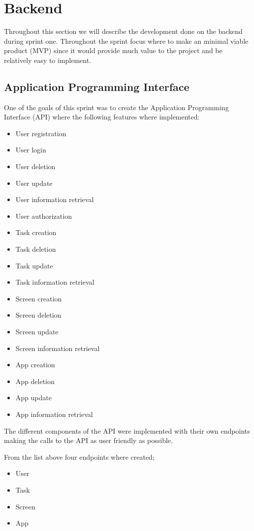 \section{Backend}

Throughout this section we will describe the development done on the backend during sprint one.
Throughout the sprint focus where to make an minimal viable product (MVP) since it would provide much value to the project and be relatively easy to implement.

\subsection{Application Programming Interface}

One of the goals of this sprint was to create the Application Programming Interface (API) where the following features where implemented:
\begin{itemize}
    \item User registration
    \item User login
    \item User deletion
    \item User update
    \item User information retrieval
    \item User authorization
    \item Task creation
    \item Task deletion
    \item Task update
    \item Task information retrieval
    \item Screen creation
    \item Screen deletion
    \item Screen update
    \item Screen information retrieval
    \item App creation
    \item App deletion
    \item App update
    \item App information retrieval
\end{itemize}

The different components of the API were implemented with their own endpoints making the calls to the API as user friendly as possible.

From the list above four endpoints where created;
\begin{itemize}
    \item User
    \item Task
    \item Screen
    \item App
\end{itemize}

